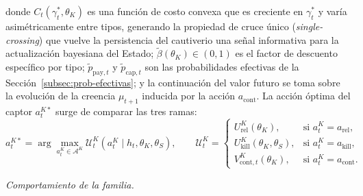 \documentclass[review,authoryear,12pt]{elsarticle}
\theoremstyle{plain}
\theoremstyle{definition}
\newcommand{\1}{\mathbf{1}}
\begin{document}
donde $C_t(\gamma_t^\ast,\theta_K)$ es una función de costo convexa que es creciente en $\gamma_t^\ast$ y varía asimétricamente entre tipos, generando la propiedad de cruce único (\textit{single-crossing}) que vuelve la persistencia del cautiverio una señal informativa para la actualización bayesiana del Estado; $\tilde{\beta}(\theta_K)\in(0,1)$ es el factor de descuento específico por tipo; $\tilde{p}_{\mathrm{pay},t}$ y $\tilde{p}_{\mathrm{cap},t}$ son las probabilidades efectivas de la Sección~\ref{subsec:prob-efectivas}; y la continuación del valor futuro se toma sobre la evolución de la creencia $\mu_{t+1}$ inducida por la acción $a_{\mathrm{cont}}$. La acción óptima del captor $a_t^{K\ast}$ surge de comparar las tres ramas:
\begin{equation}
a_t^{K\ast}=\arg\max_{a_t^K\in\mathcal{A}^K}\mathcal{U}^K_t(a_t^K\mid h_t,\theta_K,\theta_S),\qquad
\mathcal{U}^K_t=\begin{cases}U^K_{\mathrm{rel}}(\theta_K), & \text{si }a_t^K=a_{\mathrm{rel}},\\U^K_{\mathrm{kill}}(\theta_K,\theta_S), & \text{si }a_t^K=a_{\mathrm{kill}},\\V^K_{\mathrm{cont},t}(\theta_K), & \text{si }a_t^K=a_{\mathrm{cont}}.\end{cases}
\label{eq:k-argmax}
\end{equation}

\noindent\textit{Comportamiento de la familia.}
\end{document}
